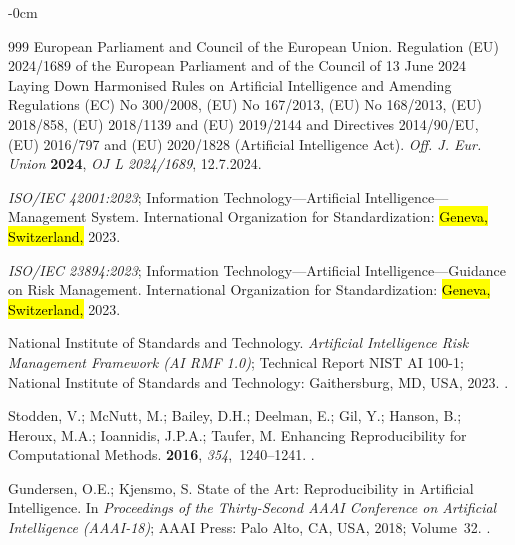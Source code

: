\documentclass[systems,article,accept,moreauthors,pdftex]{Definitions/mdpi}
\begin{document}
\begin{adjustwidth}{-\extralength}{0cm}
\begin{thebibliography}{999}
{European Parliament and Council of the European Union}.
\newblock Regulation ({EU}) 2024/1689 of the {European} {Parliament} and of the
  {Council} of 13 {June} 2024 Laying Down Harmonised Rules on Artificial
  Intelligence and Amending Regulations ({EC}) No 300/2008, ({EU}) No 167/2013,
  ({EU}) No 168/2013, ({EU}) 2018/858, ({EU}) 2018/1139 and ({EU}) 2019/2144
  and Directives 2014/90/{EU}, ({EU}) 2016/797 and ({EU}) 2020/1828
  ({Artificial} {Intelligence} {Act}).
\newblock \emph{Off. J. Eur. Union} \textbf{2024}, \emph{OJ L 2024/1689}, 12.7.2024.

\emph{{ISO/IEC} 42001:2023}; Information Technology---Artificial
  Intelligence---Management System.
\newblock International Organization for Standardization: \hl{Geneva, Switzerland,} %
  2023.

\emph{{ISO/IEC} 23894:2023}; Information Technology---Artificial
  Intelligence---Guidance on Risk Management.
\newblock International Organization for Standardization: \hl{Geneva, Switzerland,}  2023.

{National Institute of Standards and Technology}.
\newblock \emph{Artificial Intelligence Risk Management Framework ({AI RMF} 1.0)};
\newblock Technical Report NIST AI 100-1; National Institute of Standards and
  Technology: Gaithersburg, MD, USA,  2023.
.


Stodden, V.; McNutt, M.; Bailey, D.H.; Deelman, E.; Gil, Y.; Hanson, B.;
  Heroux, M.A.; Ioannidis, J.P.A.; Taufer, M.
\newblock Enhancing Reproducibility for Computational Methods.
 {\bf 2016}, {\em 354},~1240--1241.
.

Gundersen, O.E.; Kjensmo, S.
\newblock State of the Art: Reproducibility in Artificial Intelligence.
\newblock In \emph{Proceedings of the  Thirty-Second AAAI
  Conference on Artificial Intelligence (AAAI-18)}; AAAI Press: Palo Alto, CA, USA, 2018;
  Volume~32.
.


\end{thebibliography}
\end{adjustwidth}
\end{document}
